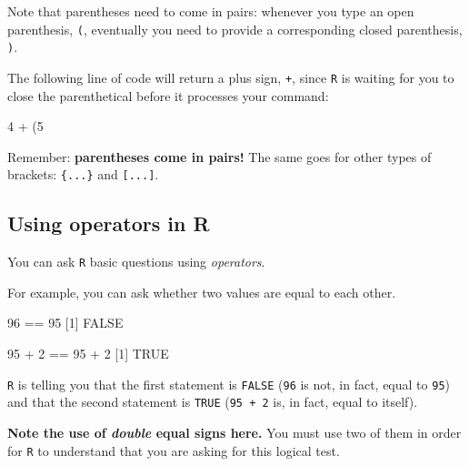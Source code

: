 \documentclass[
]{book}
\newenvironment{Shaded}{\begin{snugshade}}{\end{snugshade}}
\newcommand{\ConstantTok}[1]{\textcolor[rgb]{0.00,0.00,0.00}{#1}}
\newcommand{\DecValTok}[1]{\textcolor[rgb]{0.00,0.00,0.81}{#1}}
\newcommand{\NormalTok}[1]{#1}
\newcommand{\SpecialCharTok}[1]{\textcolor[rgb]{0.00,0.00,0.00}{#1}}
\begin{document}
Note that parentheses need to come in pairs: whenever you type an open parenthesis, \texttt{(}, eventually you need to provide a corresponding closed parenthesis, \texttt{)}.

The following line of code will return a plus sign, \texttt{+}, since \texttt{R} is waiting for you to close the parenthetical before it processes your command:

\begin{Shaded}
\begin{Highlighting}[]
\DecValTok{4} \SpecialCharTok{+}\NormalTok{ (}\DecValTok{5}
\end{Highlighting}
\end{Shaded}

Remember: \textbf{parentheses come in pairs!} The same goes for other types of brackets: \texttt{\{...\}} and \texttt{{[}...{]}}.

\hypertarget{using-operators-in-r}{%
\subsection*{Using operators in R}\label{using-operators-in-r}}

You can ask \texttt{R} basic questions using \emph{operators}.

For example, you can ask whether two values are equal to each other.

\begin{Shaded}
\begin{Highlighting}[]
\DecValTok{96} \SpecialCharTok{==} \DecValTok{95}
\NormalTok{[}\DecValTok{1}\NormalTok{] }\ConstantTok{FALSE}
\end{Highlighting}
\end{Shaded}

\begin{Shaded}
\begin{Highlighting}[]
\DecValTok{95} \SpecialCharTok{+} \DecValTok{2} \SpecialCharTok{==} \DecValTok{95} \SpecialCharTok{+} \DecValTok{2}
\NormalTok{[}\DecValTok{1}\NormalTok{] }\ConstantTok{TRUE}
\end{Highlighting}
\end{Shaded}

\texttt{R} is telling you that the first statement is \texttt{FALSE} (\texttt{96} is not, in fact, equal to \texttt{95}) and that the second statement is \texttt{TRUE} (\texttt{95\ +\ 2} is, in fact, equal to itself).

\textbf{Note the use of \emph{double} equal signs here.} You must use two of them in order for \texttt{R} to understand that you are asking for this logical test.
\end{document}
